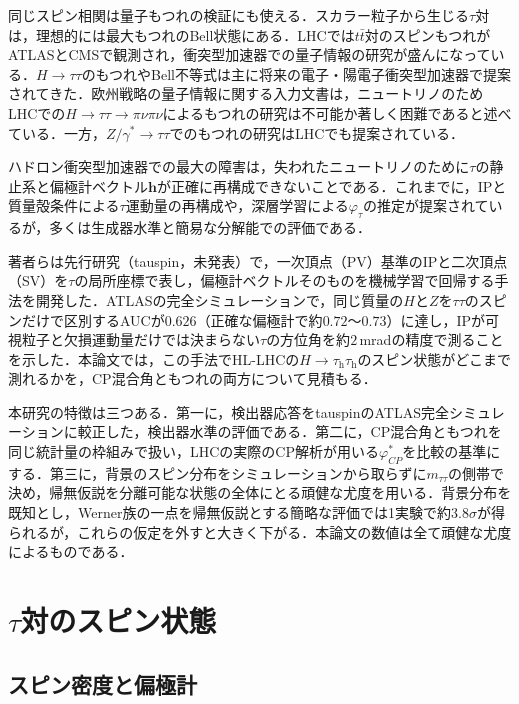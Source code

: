 \documentclass[paper=a4,fontsize=10pt,jafontsize=10pt,line_length=44zw,number_of_lines=46]{jlreq}
\newcommand{\tauh}{\tau_{\mathrm{h}}}
\newcommand{\hvec}{\boldsymbol{h}}
\newcommand{\phicp}{\varphi^{*}_{CP}}
\begin{document}
同じスピン相関は量子もつれの検証にも使える．スカラー粒子から生じる$\tau$対は，理想的には最大もつれのBell状態にある．LHCでは$t\bar t$対のスピンもつれがATLASとCMSで観測され\cite{ATLAS:2023fsd,CMS:2024pts,Afik:2020onf}，衝突型加速器での量子情報の研究が盛んになっている．$H\to\tau\tau$のもつれやBell不等式は主に将来の電子・陽電子衝突型加速器で提案されてきた\cite{Altakach:2022ywa,Fabbrichesi:2022ovb,Ma:2023yvd}．欧州戦略の量子情報に関する入力文書\cite{QI:ESPPU}は，ニュートリノのためLHCでの$H\to\tau\tau\to\pi\nu\pi\nu$によるもつれの研究は不可能か著しく困難であると述べている．一方，$Z/\gamma^*\to\tau\tau$でのもつれの研究はLHCでも提案されている\cite{ZttEnt}．

ハドロン衝突型加速器での最大の障害は，失われたニュートリノのために$\tau$の静止系と偏極計ベクトル$\hvec$が正確に再構成できないことである．これまでに，IPと質量殻条件による$\tau$運動量の再構成\cite{Hagiwara:2016zqz,HtautauCPV}や，深層学習による$\varphi_\tau$の推定\cite{Jozefowicz:2016kvz,Lasocha:2020ctd,Lasocha:2024}が提案されているが，多くは生成器水準と簡易な分解能での評価である．

著者らは先行研究（tauspin，未発表）で，一次頂点（PV）基準のIPと二次頂点（SV）を$\tau$の局所座標で表し，偏極計ベクトルそのものを機械学習で回帰する手法を開発した．ATLASの完全シミュレーションで，同じ質量の$H$と$Z$を$\tau\tau$のスピンだけで区別するAUCが$0.626$（正確な偏極計で約$0.72$〜$0.73$）に達し，IPが可視粒子と欠損運動量だけでは決まらない$\tau$の方位角を約$2$\,mradの精度で測ることを示した．本論文では，この手法でHL-LHCの$H\to\tauh\tauh$のスピン状態がどこまで測れるかを，CP混合角ともつれの両方について見積もる．

本研究の特徴は三つある．第一に，検出器応答をtauspinのATLAS完全シミュレーションに較正した，検出器水準の評価である．第二に，CP混合角ともつれを同じ統計量の枠組みで扱い，LHCの実際のCP解析が用いる$\phicp$を比較の基準にする．第三に，背景のスピン分布をシミュレーションから取らずに$m_{\tau\tau}$の側帯で決め，帰無仮説を分離可能な状態の全体にとる頑健な尤度を用いる．背景分布を既知とし，Werner族の一点を帰無仮説とする簡略な評価では1実験で約$3.8\sigma$が得られるが，これらの仮定を外すと大きく下がる．本論文の数値は全て頑健な尤度によるものである．

\section{$\tau$対のスピン状態}\label{sec:spin}

\subsection{スピン密度と偏極計}
\end{document}
